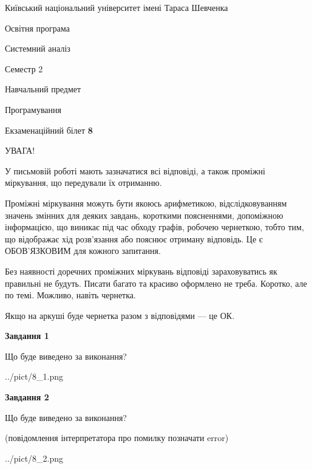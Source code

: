 \documentclass[12pt, ukrainian]{article}
\begin{document}
{{\begin {small}\par
{ \center  Київський національний університет імені Тараса Шевченка \par}
{\parbox {5 cm}{Освітня програма \hfill}{\parbox {7 cm}{Системний аналіз \hfill}}\parbox {6 cm}{\hfill Семестр 2}}\par
{\parbox {5 cm} {Навчальний предмет \hfill}\parbox {7 cm}{Програмування \hfill}\parbox {6cm}{\hfill}\par}\vspace{-7pt} \end{small}}{\center Екзаменаційний білет \No \textbf
{ 8 }\par}}
{
\begin {large}
УВАГА!

У письмовій роботі мають зазначатися всі відповіді, а також проміжні міркування, що передували їх отриманню.

Проміжні міркування можуть бути якоюсь арифметикою, відслідковуванням зна\-чень змінних для деяких завдань,
короткими поясненнями, допоміжною інформацією, що виникає під час обходу графів, робочею чернеткою,
тобто тим, що відображає хід розв’язання або пояснює отриману відповідь.
Це є ОБОВ’ЯЗКОВИМ для кожного запитання.

Без наявності доречних проміжних міркувань відповіді зараховуватись як правиль\-ні не будуть.
Писати багато та красиво оформлено не треба. Коротко, але по темі. Можли\-во, навіть чернетка.

Якщо на аркуші буде чернетка разом з відповідями --- це ОК.

\newpage

{\begin {center}\textbf{Завдання 1}\end {center}}\par
Що буде виведено за виконання?\par
\begin{center}
	{../pict/8_1.png}
\end{center}
\newpage

{\begin {center}\textbf{Завдання 2}\end {center}}\par
Що буде виведено за виконання?\par
 (повідомлення інтерпретатора про помилку позначати error)\par
\begin{center}
	{../pict/8_2.png}
\end{center}
\newpage


\end{large}}
\end{document}
